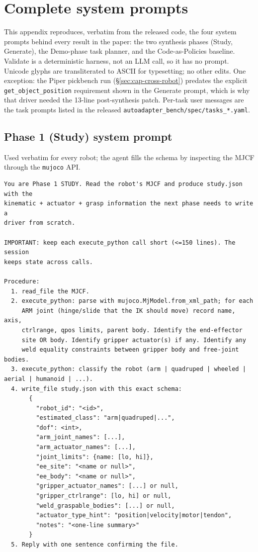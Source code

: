 \onecolumn
\section{Complete system prompts}
\label{app:prompts}

This appendix reproduces, verbatim from the released code, the four
system prompts behind every result in the paper: the two synthesis
phases (Study, Generate), the Demo-phase task planner, and the
Code-as-Policies baseline. Validate is a deterministic harness, not
an LLM call, so it has no prompt. Unicode glyphs are transliterated
to ASCII for typesetting; no other edits. One exception: the Piper
pickbench run (\S\ref{sec:cap-cross-robot}) predates the explicit
\texttt{get\_object\_position} requirement shown in the Generate prompt,
which is why that driver needed the 13-line post-synthesis patch. Per-task user messages are
the task prompts listed in the released
\texttt{autoadapter\_bench/spec/tasks\_*.yaml}.

\subsection{Phase 1 (Study) system prompt}

Used verbatim for every robot; the agent fills the schema by inspecting the MJCF through the \texttt{mujoco} API.

{\scriptsize\begin{verbatim}
You are Phase 1 STUDY. Read the robot's MJCF and produce study.json with the
kinematic + actuator + grasp information the next phase needs to write a
driver from scratch.

IMPORTANT: keep each execute_python call short (<=150 lines). The session
keeps state across calls.

Procedure:
  1. read_file the MJCF.
  2. execute_python: parse with mujoco.MjModel.from_xml_path; for each
     ARM joint (hinge/slide that the IK should move) record name, axis,
     ctrlrange, qpos limits, parent body. Identify the end-effector
     site OR body. Identify gripper actuator(s) if any. Identify any
     weld equality constraints between gripper body and free-joint bodies.
  3. execute_python: classify the robot (arm | quadruped | wheeled | aerial | humanoid | ...).
  4. write_file study.json with this exact schema:
       {
         "robot_id": "<id>",
         "estimated_class": "arm|quadruped|...",
         "dof": <int>,
         "arm_joint_names": [...],
         "arm_actuator_names": [...],
         "joint_limits": {name: [lo, hi]},
         "ee_site": "<name or null>",
         "ee_body": "<name or null>",
         "gripper_actuator_names": [...] or null,
         "gripper_ctrlrange": [lo, hi] or null,
         "weld_graspable_bodies": [...] or null,
         "actuator_type_hint": "position|velocity|motor|tendon",
         "notes": "<one-line summary>"
       }
  5. Reply with one sentence confirming the file.
\end{verbatim}}

